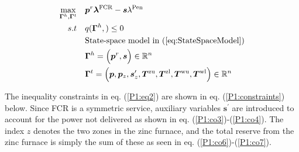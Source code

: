 \documentclass[lettersize,journal]{IEEEtran}
\begin{document}
\begin{subequations}\label{P1:compact_model_fcr}
    \begin{align}
        \underset{\bm{\Gamma}^{h},\bm{\Gamma}^{t}}{\textrm{max}} \quad & \bm{p}^{r} \bm{\lambda}^{\text{FCR}} - \bm{s}\lambda^{\text{Pen}} \label{P1:eq1}
        \\
        s.t \quad                                                      & q(\bm{\Gamma}^{h}, ) \leq 0 \label{P1:eq2}                                                                                                                                                  \\
        \quad                                                          & \text{State-space model in } (\ref{eq:StateSpaceModel}) \label{P1:eq8}                                                                                                                      \\
        \quad
                                                                       & \bm{\Gamma}^{h} = \Bigl( \bm{p}^{r}, \bm{s} \Bigr) \in \mathbb{R}^{n}  \label{P1:eq9}                                                                                                       \\
        \quad
                                                                       & \bm{\Gamma}^{t} = \Bigl( \bm{p}, \bm{p}_{z}, \bm{s}^{\prime}_{z}, \bm{T}^{\text{zu}}, \bm{T}^{\text{zl}}, \bm{T}^{\text{wu}}, \bm{T}^{\text{wl}} \Bigr) \in \mathbb{R}^{n}  \label{P1:eq10}
    \end{align}
\end{subequations}

The inequality constraints in eq. (\ref{P1:eq2}) are shown in eq. (\ref{P1:constraints}) below. Since FCR is a symmetric service, auxiliary variables $\bm{s}^{\prime}$ are introduced to account for the power not delivered as shown in eq. (\ref{P1:co3})-(\ref{P1:co4}). The index $z$ denotes the two zones in the zinc furnace, and the total reserve from the zinc furnace is simply the sum of these as seen in eq. (\ref{P1:co6})-(\ref{P1:co7}).
\end{document}
